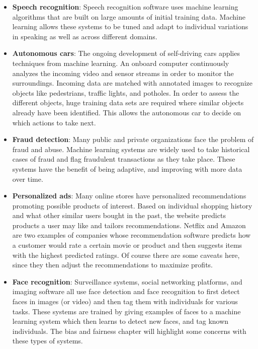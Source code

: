 \documentclass[]{krantz}
\begin{document}
\begin{itemize}
\item
  \textbf{Speech recognition}: Speech recognition software uses machine
  learning algorithms that are built on large amounts of initial
  training data. Machine learning allows these systems to be tuned and
  adapt to individual variations in speaking as well as across different
  domains.
\item
  \textbf{Autonomous cars}: The ongoing development of self-driving cars
  applies techniques from machine learning. An onboard computer
  continuously analyzes the incoming video and sensor streams in order
  to monitor the surroundings. Incoming data are matched with annotated
  images to recognize objects like pedestrians, traffic lights, and
  potholes. In order to assess the different objects, huge training data
  sets are required where similar objects already have been identified.
  This allows the autonomous car to decide on which actions to take
  next.
\item
  \textbf{Fraud detection}: Many public and private organizations face
  the problem of fraud and abuse. Machine learning systems are widely
  used to take historical cases of fraud and flag fraudulent
  transactions as they take place. These systems have the benefit of
  being adaptive, and improving with more data over time.
\item
  \textbf{Personalized ads}: Many online stores have personalized
  recommendations promoting possible products of interest. Based on
  individual shopping history and what other similar users bought in the
  past, the website predicts products a user may like and tailors
  recommendations. Netflix and Amazon are two examples of companies
  whose recommendation software predicts how a customer would rate a
  certain movie or product and then suggests items with the highest
  predicted ratings. Of course there are some caveats here, since they
  then adjust the recommendations to maximize profits.
\item
  \textbf{Face recognition}: Surveillance systems, social networking
  platforms, and imaging software all use face detection and face
  recognition to first detect faces in images (or video) and then tag
  them with individuals for various tasks. These systems are trained by
  giving examples of faces to a machine learning system which then
  learns to detect new faces, and tag known individuals. The bias and
  fairness chapter will highlight some concerns with these types of
  systems.
\end{itemize}
\end{document}
